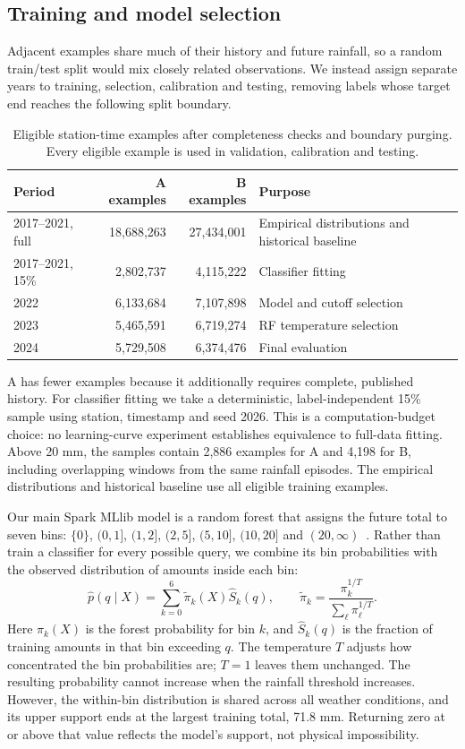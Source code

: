 \subsection{Training and model selection}
Adjacent examples share much of their history and future rainfall, so a random train/test split would mix closely related observations. We instead assign separate years to training, selection, calibration and testing, removing labels whose target end reaches the following split boundary.
\par
\begin{table}[htbp]\centering\small
\begin{tabular}{lrrp{.29\linewidth}}\toprule
Period & A examples & B examples & Purpose\\\midrule
2017--2021, full & 18,688,263 & 27,434,001 & Empirical distributions and historical baseline\\
2017--2021, 15\% & 2,802,737 & 4,115,222 & Classifier fitting\\
2022 & 6,133,684 & 7,107,898 & Model and cutoff selection\\
2023 & 5,465,591 & 6,719,274 & RF temperature selection\\
2024 & 5,729,508 & 6,374,476 & Final evaluation\\\bottomrule
\end{tabular}
\caption{Eligible station-time examples after completeness checks and boundary purging. Every eligible example is used in validation, calibration and testing.}\label{tab:t2splits}
\end{table}
\par
A has fewer examples because it additionally requires complete, published history. For classifier fitting we take a deterministic, label-independent 15\% sample using station, timestamp and seed 2026. This is a computation-budget choice: no learning-curve experiment establishes equivalence to full-data fitting. Above 20 mm, the samples contain 2,886 examples for A and 4,198 for B, including overlapping windows from the same rainfall episodes. The empirical distributions and historical baseline use all eligible training examples.

Our main Spark MLlib model is a random forest that assigns the future total to seven bins: $\{0\}$, $(0,1]$, $(1,2]$, $(2,5]$, $(5,10]$, $(10,20]$ and $(20,\infty)$~\cite{sparkml}. Rather than train a classifier for every possible query, we combine its bin probabilities with the observed distribution of amounts inside each bin:
\[
\widehat p(q\mid X)=\sum_{k=0}^{6}\widetilde\pi_k(X)\widehat S_k(q),
\qquad
\widetilde\pi_k=\frac{\pi_k^{1/T}}{\sum_\ell\pi_\ell^{1/T}}.
\]
Here $\pi_k(X)$ is the forest probability for bin $k$, and $\widehat S_k(q)$ is the fraction of training amounts in that bin exceeding $q$. The temperature $T$ adjusts how concentrated the bin probabilities are; $T=1$ leaves them unchanged. The resulting probability cannot increase when the rainfall threshold increases. However, the within-bin distribution is shared across all weather conditions, and its upper support ends at the largest training total, 71.8 mm. Returning zero at or above that value reflects the model's support, not physical impossibility.


